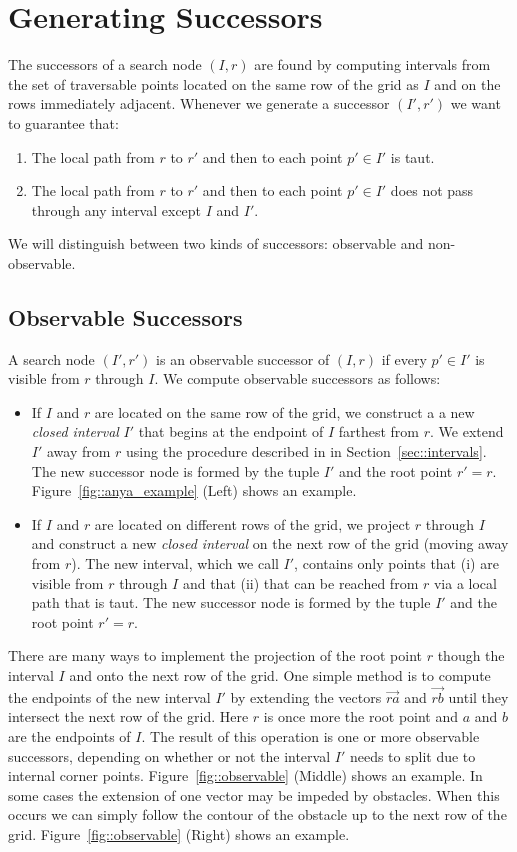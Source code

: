 \section{Generating Successors}
\label{sec::successors}
The successors of a search node $(I, r)$ are found by computing intervals from
the set of traversable points located on the same row of the grid as $I$ and
on the rows immediately adjacent.  
Whenever we generate a successor $(I', r')$ we want to guarantee that:
\begin{enumerate}
\item The local path from $r$ to $r'$ and then to each point $p' \in I'$ is taut.
\item The local path from $r$ to $r'$ and then to each point $p' \in I'$  does not pass
through any interval except $I$ and $I'$.
\end{enumerate}

We will distinguish between two kinds of successors: observable and non-observable. 

\subsection{Observable Successors}
A search node $(I', r')$ is an observable successor of $(I, r)$ if every 
$p' \in I'$ is visible from $r$ through $I$.
We compute observable successors as follows:

\begin{itemize}
\item If $I$ and $r$ are located on the same row of the grid, we construct a
a new \emph{closed interval} $I'$ that begins at the endpoint of $I$ farthest from $r$.
We extend $I'$ away from $r$ using the procedure described in in Section~\ref{sec::intervals}.
The new successor node is formed by the tuple $I'$ and the root point $r' = r$.
Figure~\ref{fig::anya_example} (Left) shows an example.
\item If $I$ and $r$ are located on different rows of the grid, we project $r$ through $I$
and construct a new \emph{closed interval} on the next row of the grid (moving away from $r$).
The new interval, which we call $I'$, contains only points that (i) are visible from $r$ through $I$
and that (ii) that can be reached from $r$ via a local path that is taut. 
The new successor node is formed by the tuple $I'$ and the root point $r' = r$.
\end{itemize}

There are many ways to implement the projection of the root point $r$ though the interval $I$
and onto the next row of the grid.
One simple method is to compute the endpoints of the new interval $I'$ by extending the
vectors $\vec{ra}$ and $\vec{rb}$ until they intersect the next row of the grid. 
Here $r$ is once more the root point and $a$ and $b$ are the endpoints of $I$.
The result of this operation is one or more observable successors, depending on whether or
not the interval $I'$ needs to split due to internal corner points.
Figure~\ref{fig::observable} (Middle) shows an example. 
In some cases the extension of one 
vector may be impeded by obstacles. When this occurs we can simply follow the contour of
the obstacle up to the next row of the grid. Figure~\ref{fig::observable} (Right) shows
an example.  


